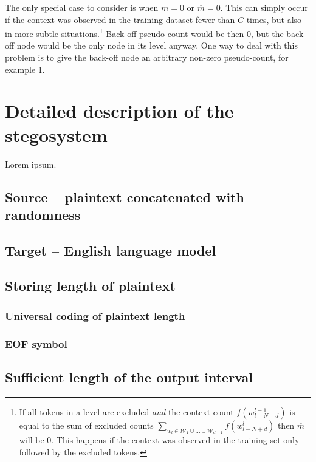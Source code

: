 \documentclass{IIBproject}
\begin{document}
The only special case to consider is when $m=0$ or $\overline m = 0$. This can simply occur if the context was observed in the training dataset fewer than $C$ times, but also in more subtle situations.\footnote{If all tokens in a level are excluded \emph{and} the context count $f(w_{l-N+d}^{l-1})$ is equal to the sum of excluded counts $\sum_{w_l \in \mathcal W_1 \cup \dots \cup \mathcal W_{d-1}} f(w_{l-N+d}^l)$ then $\overline m$ will be 0. This happens if the context was observed in the training set only followed by the excluded tokens.} Back-off pseudo-count would be then 0, but the back-off node would be the only node in its level anyway. One way to deal with this problem is to give the back-off node an arbitrary non-zero pseudo-count, for example 1.

\newpage
\section{Detailed description of the stegosystem}

Lorem ipsum.

\subsection{Source -- plaintext concatenated with randomness}

\subsection{Target -- English language model}

\subsection{Storing length of plaintext}

\subsubsection{Universal coding of plaintext length}

\subsubsection{EOF symbol}

\subsection{Sufficient length of the output interval}
\end{document}
